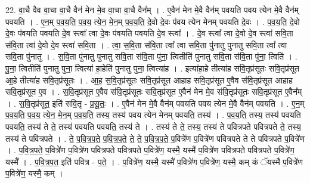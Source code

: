 \documentclass[17pt]{extarticle}
\begin{document}
22. वा॒चै वैव वा॒चा वा॒चै वैन॑ मेन मे॒व वा॒चा वा॒चै वैन᳚म् । . ए॒वैन॑ मेन मे॒वै वैन॑म् पवयति पवय त्येन मे॒वै वैन॑म् पवयति । . ए॒न॒म् प॒व॒य॒ति॒ प॒व॒य॒ त्ये॒न॒ मे॒न॒म् प॒व॒य॒ति॒ दे॒वो दे॒वः प॑वय त्येन मेनम् पवयति दे॒वः । . प॒व॒य॒ति॒ दे॒वो दे॒वः प॑वयति पवयति दे॒व स्त्वा᳚ त्वा दे॒वः प॑वयति पवयति दे॒व स्त्वा᳚ । . दे॒व स्त्वा᳚ त्वा दे॒वो दे॒व स्त्वा॑ सवि॒ता स॑वि॒ता त्वा॑ दे॒वो दे॒व स्त्वा॑ सवि॒ता । . त्वा॒ स॒वि॒ता स॑वि॒ता त्वा᳚ त्वा सवि॒ता पु॑नातु पुनातु सवि॒ता त्वा᳚ त्वा सवि॒ता पु॑नातु । . स॒वि॒ता पु॑नातु पुनातु सवि॒ता स॑वि॒ता पु॑ना॒ त्वितीति॑ पुनातु सवि॒ता स॑वि॒ता पु॑ना॒ त्विति॑ । . पु॒ना॒ त्वितीति॑ पुनातु पुना॒ त्वित्या॑ हा॒हेति॑ पुनातु पुना॒ त्वित्या॑ह । . इत्या॑हा॒हे तीत्या॑ह सवि॒तृप्र॑सूतः सवि॒तृप्र॑सूत आ॒हे तीत्या॑ह सवि॒तृप्र॑सूतः । . आ॒ह॒ स॒वि॒तृप्र॑सूतः सवि॒तृप्र॑सूत आहाह सवि॒तृप्र॑सूत ए॒वैव स॑वि॒तृप्र॑सूत आहाह सवि॒तृप्र॑सूत ए॒व । . स॒वि॒तृप्र॑सूत ए॒वैव स॑वि॒तृप्र॑सूतः सवि॒तृप्र॑सूत ए॒वैन॑ मेन मे॒व स॑वि॒तृप्र॑सूतः सवि॒तृप्र॑सूत ए॒वैन᳚म् । . स॒वि॒तृप्र॑सूत॒ इति॑ सवि॒तृ - प्र॒सू॒तः॒ । . ए॒वैन॑ मेन मे॒वै वैन॑म् पवयति पवय त्येन मे॒वै वैन॑म् पवयति । . ए॒न॒म् प॒व॒य॒ति॒ प॒व॒य॒ त्ये॒न॒ मे॒न॒म् प॒व॒य॒ति॒ तस्य॒ तस्य॑ पवय त्येन मेनम् पवयति॒ तस्य॑ । . प॒व॒य॒ति॒ तस्य॒ तस्य॑ पवयति पवयति॒ तस्य॑ ते ते॒ तस्य॑ पवयति पवयति॒ तस्य॑ ते । . तस्य॑ ते ते॒ तस्य॒ तस्य॑ ते पवित्रपते पवित्रपते ते॒ तस्य॒ तस्य॑ ते पवित्रपते । . ते॒ प॒वि॒त्र॒प॒ते॒ प॒वि॒त्र॒प॒ते॒ ते॒ ते॒ प॒वि॒त्र॒प॒ते॒ प॒वित्रे॑ण प॒वित्रे॑ण पवित्रपते ते ते पवित्रपते प॒वित्रे॑ण । . प॒वि॒त्र॒प॒ते॒ प॒वित्रे॑ण प॒वित्रे॑ण पवित्रपते पवित्रपते प॒वित्रे॑ण॒ यस्मै॒ यस्मै॑ प॒वित्रे॑ण पवित्रपते पवित्रपते प॒वित्रे॑ण॒ यस्मै᳚ । . प॒वि॒त्र॒प॒त॒ इति॑ पवित्र - प॒ते॒ । . प॒वित्रे॑ण॒ यस्मै॒ यस्मै॑ प॒वित्रे॑ण प॒वित्रे॑ण॒ यस्मै॒ कम् कं ॅयस्मै॑ प॒वित्रे॑ण प॒वित्रे॑ण॒ यस्मै॒ कम् । \newline
\end{document}
